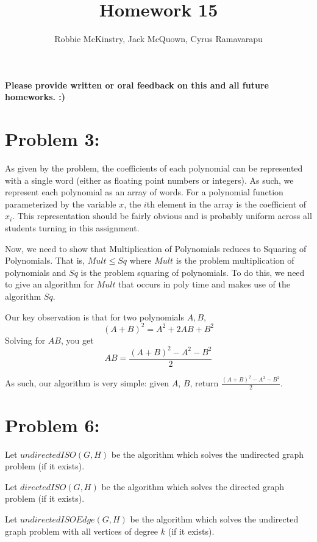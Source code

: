 \documentclass[12pt]{article}
\begin{document}
\title{Homework 15}
\author{Robbie McKinstry, Jack McQuown, Cyrus Ramavarapu}
\renewcommand{\today}{5 October 2016}
\renewcommand{\baselinestretch}{1.5}
\maketitle

\textbf{Please provide written or oral feedback on this and all future homeworks. :)}

\section*{Problem 3:}
As given by the problem, the coefficients of each polynomial can be represented with a single word (either as floating point numbers or integers). As such, we represent each polynomial as an array of words. For a polynomial function parameterized by the variable $x$, the $i$th element in the array is the coefficient of $x_{i}$. This representation should be fairly obvious and is probably uniform across all students turning in this assignment.

Now, we need to show that Multiplication of Polynomials reduces to Squaring of Polynomials. That is, $Mult \leq Sq$ where $Mult$ is the problem multiplication of polynomials and $Sq$ is the problem squaring of polynomials. To do this, we need to give an algorithm for $Mult$ that occurs in poly time and makes use of the algorithm $Sq$. 

Our key observation is that for two polynomials $A, B$, 
\[
(A+B)^{2} =  A^{2} + 2AB + B^{2}
\] Solving for $AB$, you get 
\[
AB = \frac{(A+B)^{2} - A^{2} - B^{2}}{2}
\]

As such, our algorithm is very simple: given $A$, $B$, return $\frac{(A+B)^{2} - A^{2} - B^{2}}{2}$.

\section*{Problem 6:}

Let $\textit{undirectedISO}(G, H)$ be the algorithm which solves the undirected graph problem (if it exists). 

Let $\textit{directedISO}(G, H)$ be the algorithm which solves the directed graph problem (if it exists). 

Let $\textit{undirectedISOEdge}(G, H)$ be the algorithm which solves the undirected graph problem with all vertices of degree $k$ (if it exists).
\end{document}
